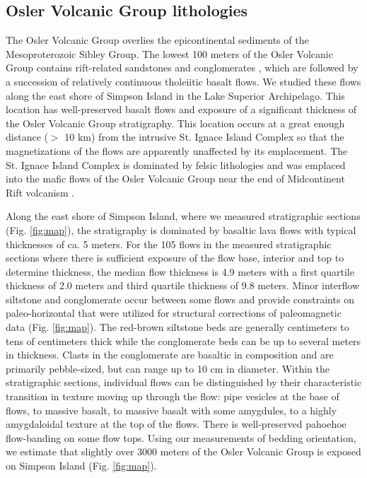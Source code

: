 \documentclass[draft,gc]{AGUTeX}
\begin{document}
\begin{article}
\subsection{Osler Volcanic Group lithologies}
The Osler Volcanic Group overlies the epicontinental sediments of the Mesoproterozoic Sibley Group. The lowest 100 meters of the Osler Volcanic Group contains rift-related sandstones and conglomerates \citep{Hollings2007a}, which are followed by a succession of relatively continuous tholeiitic basalt flows. We studied these flows along the east shore of Simpson Island in the Lake Superior Archipelago. This location has well-preserved basalt flows and exposure of a significant thickness of the Osler Volcanic Group stratigraphy. This location occurs at a great enough distance ($>$ 10 km) from the intrusive St. Ignace Island Complex so that the magnetizations of the flows are apparently unaffected by its emplacement. The St. Ignace Island Complex is dominated by felsic lithologies and was emplaced into the mafic flows of the Osler Volcanic Group near the end of Midcontinent Rift volcanism \citep{Hollings2007b}.

Along the east shore of Simpson Island, where we measured stratigraphic sections (Fig. \ref{fig:map}), the stratigraphy is dominated by basaltic lava flows with typical thicknesses of ca. 5 meters. For the 105 flows in the measured stratigraphic sections where there is sufficient exposure of the flow base, interior and top to determine thickness, the median flow thickness is 4.9 meters with a first quartile thickness of 2.0 meters and third quartile thickness of 9.8 meters. Minor interflow siltstone and conglomerate occur between some flows and provide constraints on paleo-horizontal that were utilized for structural corrections of paleomagnetic data (Fig. \ref{fig:map}). The red-brown siltstone beds are generally centimeters to tens of centimeters thick while the conglomerate beds can be up to several meters in thickness. Clasts in the conglomerate are basaltic in composition and are primarily pebble-sized, but can range up to 10 cm in diameter. Within the stratigraphic sections, individual flows can be distinguished by their characteristic transition in texture moving up through the flow: pipe vesicles at the base of flows, to massive basalt, to massive basalt with some amygdules, to a highly amygdaloidal texture at the top of the flows. There is well-preserved pahoehoe flow-banding on some flow tops. Using our measurements of bedding orientation, we estimate that slightly over 3000 meters of the Osler Volcanic Group is exposed on Simpson Island (Fig. \ref{fig:map}).


\end{article}
\end{document}
